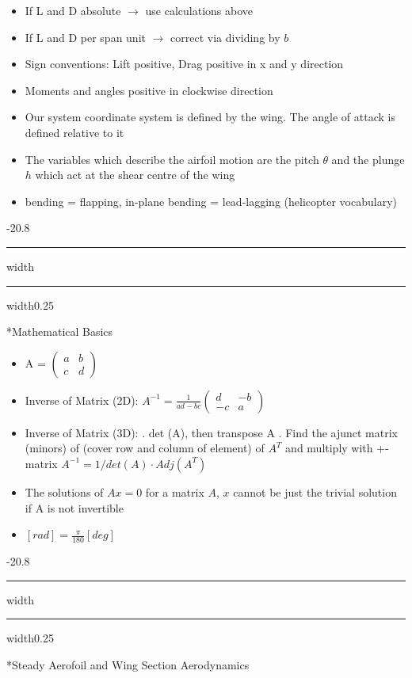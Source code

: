 \documentclass[8pt, landscape, fleqn]{scrartcl}
\makeatletter
\renewcommand{\section}{\@startsection{section}{1}{0mm}%
{-2\baselineskip}{0.8\baselineskip}%
{\hrule depth 0.2pt width\columnwidth\hrule depth1.5pt
width0.25\columnwidth\vspace*{1.2em}\Large\bfseries\rmfamily}}
\renewcommand{\subsection}{\@startsection{subsection}{1}{0mm}%
{-2\baselineskip}{0.8\baselineskip}%
{\hrule depth 0.2pt width\columnwidth\hrule depth0.75pt
width0.25\columnwidth\vspace*{1.2em}\large\bfseries\rmfamily}}
\makeatother
\begin{document}
\begin{multicols*}{3}
\begin{itemize}
    \item If L and D absolute $\rightarrow$ use calculations above
    \item If L and D per span unit $\rightarrow$ correct via dividing by $b$
    \item Sign conventions: Lift positive, Drag positive in x and y direction
    \item Moments and angles positive in clockwise direction
    \item Our system coordinate system is defined by the wing. The angle of attack is defined relative to it
    \item The variables which describe the airfoil motion are the pitch $\theta$ and the plunge $h$ which act at the shear centre of the wing
    \item bending = flapping, in-plane bending = lead-lagging (helicopter vocabulary)
\end{itemize}

\subsection*{Mathematical Basics}

\begin{itemize}
    \item A = $\begin{pmatrix} a & b \\ c & d
    \end{pmatrix}$
    \item Inverse of Matrix (2D): $A^{-1} = \frac{1}{ad-bc} \begin{pmatrix} d & -b \\ -c & a
    \end{pmatrix}$
    \item Inverse of Matrix (3D): 
        . det (A), then transpose A
        . Find the ajunct matrix (minors) of
        \subitem (cover row and column of element) of $A^T$ 
        \subitem and multiply with +- matrix
        \subitem $A^{-1} = 1/det(A)\cdot Adj(A^T)$
    \item The solutions of $A x = 0$ for a matrix $A$, $x$ cannot be just the trivial solution if A is not invertible
    \item $[rad] = \frac{\pi}{180} [deg]$
\end{itemize}



\section*{Steady Aerofoil and Wing Section Aerodynamics}


\end{multicols*}
\end{document}
